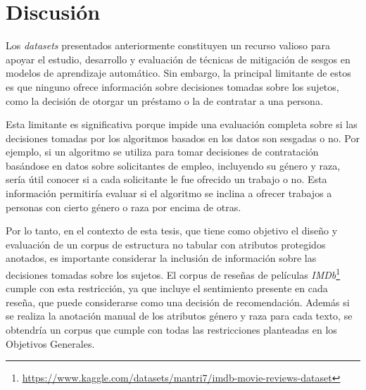 \section{Discusi\'on}

Los \emph{datasets} presentados anteriormente constituyen un recurso valioso para apoyar el estudio, desarrollo y evaluaci\'on de t\'ecnicas de 
mitigaci\'on de sesgos en modelos de aprendizaje autom\'atico. Sin embargo, la principal limitante de estos es que ninguno ofrece 
informaci\'on sobre decisiones tomadas sobre los sujetos, como la decisi\'on de otorgar un pr\'estamo o la de contratar a una persona.

Esta limitante es significativa porque impide una evaluaci\'on completa sobre si las decisiones tomadas por los algoritmos basados 
en los datos son sesgadas o no. Por ejemplo, si un algoritmo se utiliza para tomar decisiones de contrataci\'on bas\'andose en datos
sobre solicitantes de empleo, incluyendo su g\'enero y raza, ser\'ia \'util conocer si a cada solicitante le fue ofrecido 
un trabajo o no. Esta informaci\'on permitir\'ia evaluar si el algoritmo se inclina a ofrecer trabajos a personas con cierto g\'enero o raza
por encima de otras.

Por lo tanto, en el contexto de esta tesis, que tiene como objetivo el dise\~no y evaluaci\'on de un corpus de estructura no tabular
con atributos protegidos anotados, es importante considerar la inclusi\'on de informaci\'on sobre las decisiones tomadas sobre los sujetos.
El corpus de rese\~nas de pel\'iculas \emph{IMDb}\footnote{\url{https://www.kaggle.com/datasets/mantri7/imdb-movie-reviews-dataset}}
cumple con esta restricci\'on, ya que incluye el sentimiento presente en cada rese\~na, que puede considerarse como una decisi\'on de 
recomendaci\'on. Adem\'as si se realiza la anotaci\'on manual de los atributos g\'enero y raza para cada texto, se obtendr\'ia un corpus
que cumple con todas las restricciones planteadas en los Objetivos Generales.